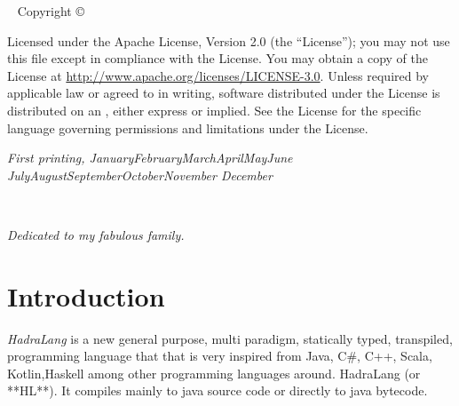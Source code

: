 \documentclass{tufte-book}
\newcommand{\monthyear}{%
	\ifcase\month\or January\or February\or March\or April\or May\or June\or
	July\or August\or September\or October\or November\or
	December\fi\space\number\year
}
\begin{document}
    
    \newpage
    \begin{fullwidth}
        ~\vfill
        \thispagestyle{empty}
        \setlength{\parindent}{0pt}
        \setlength{\parskip}{\baselineskip}
        Copyright \copyright\ \the\year\ \thanklessauthor
        
        \par{}
        
        \par{}
        
        \par Licensed under the Apache License, Version 2.0 (the ``License''); you may not
        use this file except in compliance with the License. You may obtain a copy
        of the License at \url{http://www.apache.org/licenses/LICENSE-3.0}. Unless
        required by applicable law or agreed to in writing, software distributed
        under the License is distributed on an , either express or implied. See the
        License for the specific language governing permissions and limitations
        under the License.
        
        \par\textit{First printing, \monthyear}
    \end{fullwidth}

    \tableofcontents

    \listoffigures

    \listoftables

    \cleardoublepage
    ~\vfill
    \begin{doublespace}
        \noindent\fontsize{18}{22}\selectfont\itshape
        \nohyphenation
        Dedicated to my fabulous family.
    \end{doublespace}
    \vfill
    \vfill


    \cleardoublepage
    \chapter*{Introduction}

        \textit{HadraLang} is a new general purpose, multi paradigm, statically typed, transpiled, programming language that that is very inspired from Java, C\#, C++, Scala, Kotlin,Haskell among other programming languages around. HadraLang (or **HL**). It compiles mainly to java source code or directly to java bytecode.
\end{document}

